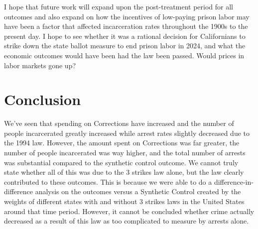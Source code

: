 \documentclass[12pt]{article}
\begin{document}
    I hope that future work will expand upon the post-treatment period for all outcomes and also expand on how the incentives of low-paying prison labor may have been a factor that affected incarceration rates throughout the 1900s to the present day. I hope to see whether it was a rational decision for Californians to strike down the state ballot measure to end prison labor in 2024, and what the economic outcomes would have been had the law been passed. Would prices in labor markets gone up? 
    
\section{Conclusion}
    We’ve seen that spending on Corrections have increased and the number of people incarcerated greatly increased while arrest rates slightly decreased due to the 1994 law. However, the amount spent on Corrections was far greater, the number of people incarcerated was way higher, and the total number of arrests was substantial compared to the synthetic control outcome. We cannot truly state whether all of this was due to the 3 strikes law alone, but the law clearly contributed to these outcomes. This is because we were able to do a difference-in-difference analysis on the outcomes versus a Synthetic Control created by the weights of different states with and without 3 strikes laws in the United States around that time period. However, it cannot be concluded whether crime actually decreased as a result of this law as too complicated to measure by arrests alone. 

\medskip

\printbibliography
\end{document}
